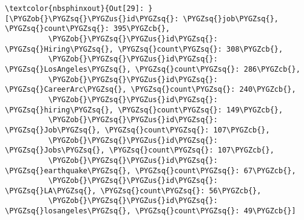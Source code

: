 \documentclass[letterpaper,10pt,english]{sphinxmanual}
\begin{document}
%
\begin{Verbatim}[commandchars=\\\{\}]
\textcolor{nbsphinxout}{Out[29]: }[\PYGZob{}\PYGZsq{}\PYGZus{}id\PYGZsq{}: \PYGZsq{}job\PYGZsq{}, \PYGZsq{}count\PYGZsq{}: 395\PYGZcb{},
          \PYGZob{}\PYGZsq{}\PYGZus{}id\PYGZsq{}: \PYGZsq{}Hiring\PYGZsq{}, \PYGZsq{}count\PYGZsq{}: 308\PYGZcb{},
          \PYGZob{}\PYGZsq{}\PYGZus{}id\PYGZsq{}: \PYGZsq{}LosAngeles\PYGZsq{}, \PYGZsq{}count\PYGZsq{}: 286\PYGZcb{},
          \PYGZob{}\PYGZsq{}\PYGZus{}id\PYGZsq{}: \PYGZsq{}CareerArc\PYGZsq{}, \PYGZsq{}count\PYGZsq{}: 240\PYGZcb{},
          \PYGZob{}\PYGZsq{}\PYGZus{}id\PYGZsq{}: \PYGZsq{}hiring\PYGZsq{}, \PYGZsq{}count\PYGZsq{}: 149\PYGZcb{},
          \PYGZob{}\PYGZsq{}\PYGZus{}id\PYGZsq{}: \PYGZsq{}Job\PYGZsq{}, \PYGZsq{}count\PYGZsq{}: 107\PYGZcb{},
          \PYGZob{}\PYGZsq{}\PYGZus{}id\PYGZsq{}: \PYGZsq{}Jobs\PYGZsq{}, \PYGZsq{}count\PYGZsq{}: 107\PYGZcb{},
          \PYGZob{}\PYGZsq{}\PYGZus{}id\PYGZsq{}: \PYGZsq{}earthquake\PYGZsq{}, \PYGZsq{}count\PYGZsq{}: 67\PYGZcb{},
          \PYGZob{}\PYGZsq{}\PYGZus{}id\PYGZsq{}: \PYGZsq{}LA\PYGZsq{}, \PYGZsq{}count\PYGZsq{}: 56\PYGZcb{},
          \PYGZob{}\PYGZsq{}\PYGZus{}id\PYGZsq{}: \PYGZsq{}losangeles\PYGZsq{}, \PYGZsq{}count\PYGZsq{}: 49\PYGZcb{}]
\end{Verbatim}
\end{document}
